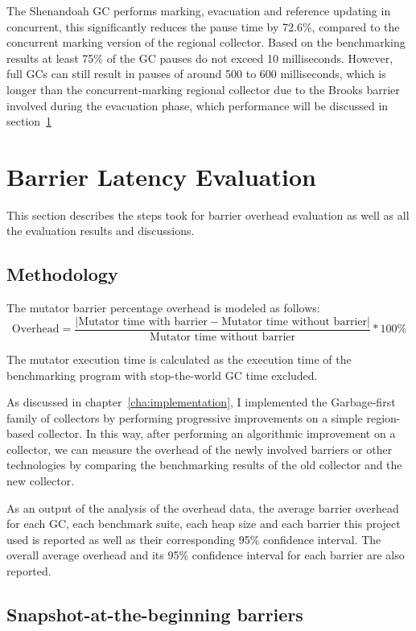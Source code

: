 The Shenandoah GC performs marking, evacuation and reference updating in concurrent,
this significantly reduces the pause time by 72.6\%, compared to the concurrent marking version
of the regional collector. Based on the benchmarking results at least 75\% of
the GC pauses do not exceed 10 milliseconds. However, full GCs can still result
in pauses of around 500 to 600 milliseconds, which is longer than the concurrent-marking
regional collector due to the Brooks barrier involved during the evacuation phase, which performance
will be discussed in section~\ref{sec:barrierlatency}

\section{Barrier Latency Evaluation} %
\label{sec:barrierlatency}

This section describes the steps took for barrier overhead evaluation as well as
all the evaluation results and discussions.

\subsection{Methodology}

The mutator barrier percentage overhead is modeled as follows:
$$
\text{Overhead} = \frac{|\text{Mutator time with barrier} - \text{Mutator time without barrier}|}{\text{Mutator time without barrier}} * 100\%
$$

The mutator execution time is calculated as the execution time of the benchmarking program with
stop-the-world GC time excluded.

As discussed in chapter~\ref{cha:implementation}, I implemented the Garbage-first
family of collectors by performing progressive improvements on a simple region-based collector.
In this way, after performing an algorithmic improvement on a collector, we can measure the overhead of
the newly involved barriers or other technologies by comparing the benchmarking results
of the old collector and the new collector.

As an output of the analysis of the overhead data, the average barrier overhead
for each GC, each benchmark suite, each heap size and each barrier this project used is reported
as well as their corresponding 95\% confidence interval.
The overall average overhead and its 95\% confidence interval for each barrier are also reported.

\subsection{Snapshot-at-the-beginning barriers}

